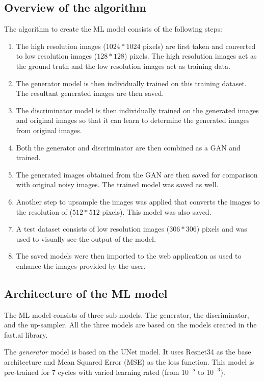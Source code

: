 \documentclass[conference]{IEEEtran}
\begin{document}
		\subsection{Overview of the algorithm}
			The algorithm to create the ML model consists of the following steps:
				\begin{enumerate}
					\item The high resolution images ($1024 * 1024$ pixels)\cite{b8} are first taken and converted to low resolution images ($128 * 128$) pixels. The high resolution images act as the ground truth and the low resolution images act as training data.
					\item The generator model is then individually trained on this training dataset. The resultant generated images are then saved.
					\item The discriminator model is then individually trained on the generated images and original images so that it can learn to determine the generated images from original images.
					\item Both the generator and discriminator are then combined as a GAN and trained.
					\item The generated images obtained from the GAN are then saved for comparison with original noisy images. The trained model was saved as well.
					\item Another step to upsample the images was applied that converts the images to the resolution of ($512 * 512$ pixels). This model was also saved.
					\item A test dataset \cite{b9} consists of low resolution images ($306 * 306$) pixels and was used to visually see the output of the model.
					\item The saved models were then imported to the web application as used to enhance the images provided by the user.
				\end{enumerate}
		\subsection{Architecture of the ML model}
			The ML model consists of three sub-models. The generator, the discriminator, and the up-sampler. All the three models are based on the models created in the fast.ai library\cite{b7}.
			
			\par The \emph{generator} model is based on the UNet model\cite{b10}. It uses Resnet34\cite{b11} as the base architecture and Mean Squared Error (MSE)\cite{b12} as the loss function. This model is pre-trained for 7 cycles with varied learning rated (from $10^{-5}$ to $10^{-3}$).
			
\end{document}
